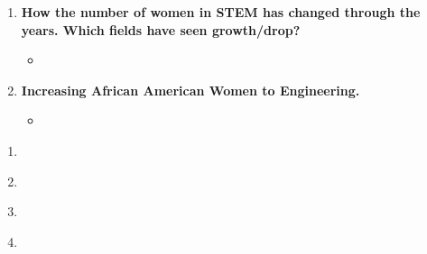 \documentclass[12pt,a4paper]{article}
\begin{document}
\begin{enumerate}
\begin{itemize}
      \item \href{https://www.theguardian.com/science/sifting-the-evidence/2015/oct/13/why-ada-lovelace-day-matters}{}
      \item \href{https://web.archive.org/web/20170312212947/http:/www.doublexscience.org/the-finkbeiner-test/}{}
      \item \href{https://publiceditor.blogs.nytimes.com/2013/04/01/gender-questions-arise-in-obituary-of-rocket-scientist-and-her-beef-stroganoff/}{}
    \end{itemize}
    \item \textbf{How the number of women in STEM has changed through the years. Which fields have seen growth/drop?}
    \begin{itemize}
      \item[] 
    \end{itemize}
    \item \textbf{Increasing African American Women to Engineering.}
    \begin{itemize}
      \item \href{https://www.nsbe.org/getattachment/News-Media/NSBE-News/ignored-potential/NSBE_IgnoredPotential_Whitepaper_TXT-FINAL.PDF.aspx}{} \imp{\&} 
    \end{itemize}
  \end{enumerate}

  \clearpage
  \begin{center}
    \large{}
  \end{center}
  \begin{enumerate}
    \item {} \href{https://www.youtube.com/watch?v=p12jUNsx5e0&feature=youtu.be}{}
    \item {} \href{https://www.youtube.com/watch?v=FKaOGuzhbM8#action=share}{}
    \item \href{https://ncses.nsf.gov/pubs/nsf19304/digest}{}
    \item \href{https://www.usatoday.com/story/news/nation/2019/10/18/nasa-astronauts-international-space-station-first-all-female-spacewalk/4020056002/}{}
  \end{enumerate}
  
\end{document}
